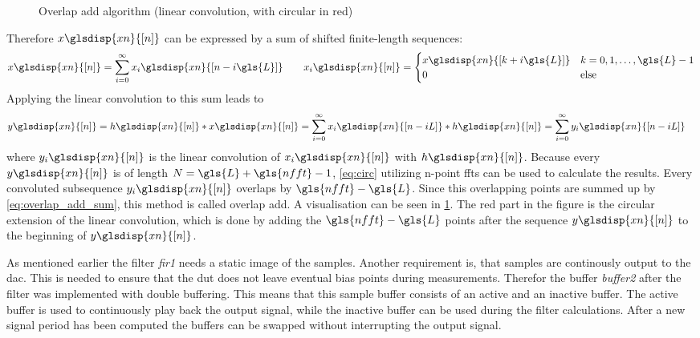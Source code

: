 \documentclass[12pt,a4paper,parskip=full,abstract=true,BCOR=12mm,twoside,open=right]{scrreprt}
\def\device#1{\mbox{\textit{#1}}}
\newcommand{\XN}{\glsdisp{xn}{[n]}}
\begin{document}
\begin{figure}[htb]
    \caption{Overlap add algorithm (linear convolution, with circular in red)}
    \label{fig:overlap_add}
\end{figure}
Therefore $x\XN$ can
be expressed by a sum of shifted finite-length sequences:
\begin{equation}
    \label{eq:sum_seq} x\XN = \sum_{i=0}^{\infty} x_i\glsdisp{xn}{[n-i\gls{L}]} \qquad x_i\XN =\begin{cases}
        x\glsdisp{xn}{[k+i\gls{L}]} & k = 0, 1, \ldots, \gls{L}-1\\
        0 & \text{else} \end{cases}
\end{equation}
Applying the linear convolution to this sum leads to
\begin{equation}
    \begin{split}\label{eq:overlap_add_sum}
        y\XN = h\XN * x\XN & = \sum_{i=0}^{\infty} x_i\glsdisp{xn}{[n-iL]} * h\XN = \sum_{i=0}^{\infty} y_i\glsdisp{xn}{[n-iL]}
    \end{split}
\end{equation}
where $y_i\XN$ is the linear convolution of $x_i\XN$ with $h\XN$. Because every $y\XN$ is of length
$N = \gls{L} + \gls{nfft} -1$, \cref{eq:circ} utilizing n-point \glspl{fft} can be used to calculate the results.
Every convoluted subsequence $y_i\XN$ overlaps by $\gls{nfft} - \gls{L}$. Since this overlapping
points are summed up by \cref{eq:overlap_add_sum}, this method is called overlap
add. A visualisation can be seen in \cref{fig:overlap_add}. The red part in the figure
is the circular extension of the linear convolution, which is done by adding the
$\gls{nfft} - \gls{L}$ points after the sequence $y\XN$ to the beginning of $y\XN$.

As mentioned earlier the filter \device{fir1} needs a static image of the samples.
Another requirement is, that samples are continously output to the \gls{dac}. This
is needed to ensure that the \gls{dut} does not leave eventual bias points during
measurements. Therefor the buffer \device{buffer2} after the filter was implemented
with double buffering. This means that this sample buffer consists of an active
and an inactive buffer. The active buffer is used to continuously play back the output
signal, while the inactive buffer can be used during the filter calculations. After
a new signal period has been computed the buffers can be swapped without interrupting
the output signal.
\end{document}
